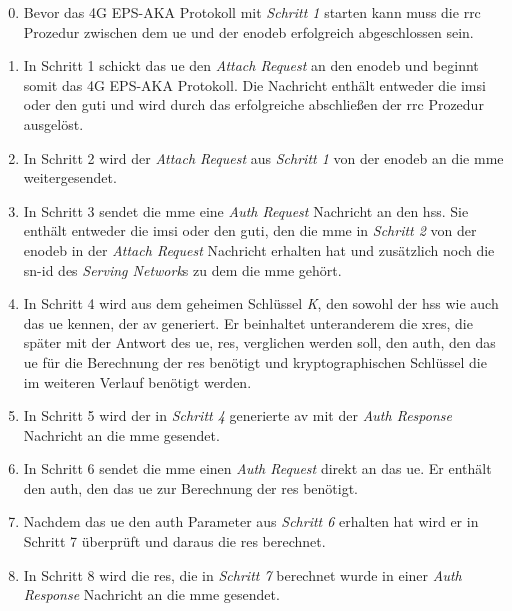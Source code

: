 \begin{enumerate}
\setcounter{enumi}{-1}
\item Bevor das 4G EPS-AKA Protokoll mit \textit{Schritt 1} starten kann muss die \gls{rrc} Prozedur zwischen dem \gls{ue} und der \gls{enodeb} erfolgreich abgeschlossen sein.

\item In Schritt 1 schickt das \gls{ue} den \textit{Attach Request} an den \gls{enodeb} und beginnt somit das 4G EPS-AKA Protokoll.
Die Nachricht enthält entweder die \gls{imsi} oder den \gls{guti} und wird durch das erfolgreiche abschließen der \gls{rrc} Prozedur ausgelöst.

\item In Schritt 2 wird der \textit{Attach Request} aus \textit{Schritt 1} von der \gls{enodeb} an die \gls{mme} weitergesendet.

\item In Schritt 3 sendet die \gls{mme} eine \textit{Auth Request} Nachricht an den \gls{hss}.
Sie enthält entweder die \gls{imsi} oder den \gls{guti}, den die \gls{mme} in \textit{Schritt 2} von der \gls{enodeb} in der \textit{Attach Request} Nachricht erhalten hat und zusätzlich noch die \gls{sn-id} des \textit{Serving Network}s zu dem die \gls{mme} gehört.

\item In Schritt 4 wird aus dem geheimen Schlüssel \textit{K}, den sowohl der \gls{hss} wie auch das \gls{ue} kennen, der \gls{av} generiert.
Er beinhaltet unteranderem die \gls{xres}, die später mit der Antwort des \gls{ue}, \gls{res}, verglichen werden soll, den \gls{auth}, den das \gls{ue} für die Berechnung der \gls{res} benötigt und kryptographischen Schlüssel die im weiteren Verlauf benötigt werden.

\item In Schritt 5 wird der in \textit{Schritt 4} generierte \gls{av} mit der \textit{Auth Response} Nachricht an die \gls{mme} gesendet.

\item In Schritt 6 sendet die \gls{mme} einen \textit{Auth Request} direkt an das \gls{ue}.
Er enthält den \gls{auth}, den das \gls{ue} zur Berechnung der \gls{res} benötigt.

\item Nachdem das \gls{ue} den \gls{auth} Parameter aus \textit{Schritt 6} erhalten hat wird er in Schritt 7 überprüft und daraus die \gls{res} berechnet.

\item In Schritt 8 wird die \gls{res}, die in \textit{Schritt 7} berechnet wurde in einer \textit{Auth Response} Nachricht an die \gls{mme} gesendet.


\end{enumerate}
